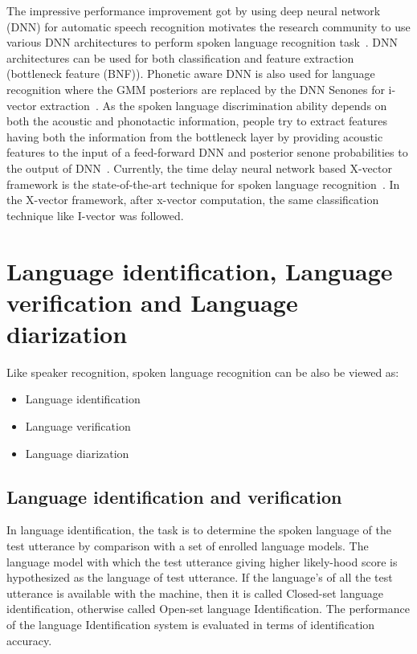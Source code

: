 \begin{spacing}{1.5}
The impressive performance improvement got by using deep neural network (DNN) for automatic speech recognition motivates the research community to use various DNN architectures to perform spoken language recognition task~\cite{richardson2015deep,gonzalez2014automatic,lopez2014automatic,lopez2016use,garcia2016stacked,snyder2018spoken,sarma2018language}. DNN architectures can be used for both classification and feature extraction (bottleneck feature (BNF)). Phonetic aware DNN is also used for language recognition where the GMM posteriors are replaced by the DNN Senones for i-vector extraction~\cite{richardson2015deep}. As the spoken language discrimination ability depends on both the acoustic and phonotactic information, people try to extract features having both the information from the bottleneck layer by providing acoustic features to the input of a feed-forward DNN and posterior senone probabilities to the output of DNN~\cite{richardson2015deep}. Currently, the time delay neural network based X-vector framework is the state-of-the-art technique for spoken language recognition~\cite{snyder2018spoken,sarma2018language}. In the X-vector framework, after x-vector computation, the same classification technique like I-vector was followed.  




\section{Language identification, Language verification and Language diarization}
Like speaker recognition, spoken language recognition can be also be viewed as:
\begin{itemize}
    \item Language identification
   
    \item Language verification
    \item Language diarization
\end{itemize}
 
\subsection{Language identification and  verification}

In language identification, the task is to determine the spoken language of the test utterance by comparison with a set of enrolled language models. The language model with which the test utterance giving higher likely-hood score is hypothesized as the language of test utterance. 
If the language's of all the test utterance is available with the machine, then it is called Closed-set language identification, otherwise called Open-set language Identification. The performance of the language Identification system is evaluated in terms of identification accuracy.


\end{spacing}
